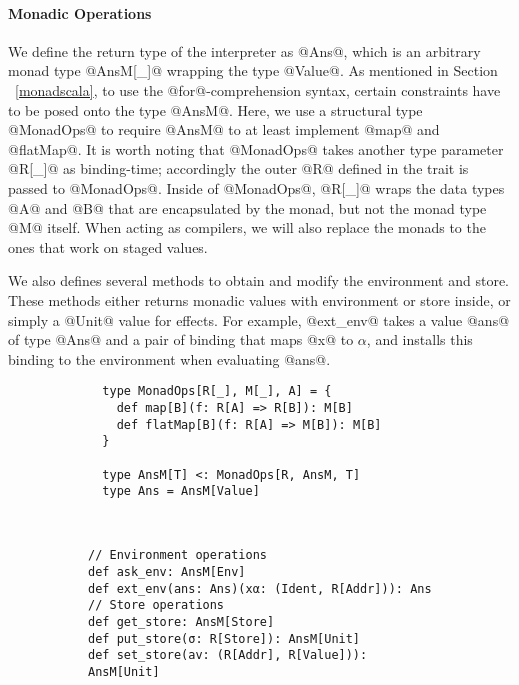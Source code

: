 \paragraph{Monadic Operations} We define the return type of the interpreter as
@Ans@, which is an arbitrary monad type @AnsM[_]@ wrapping the type @Value@. 
As mentioned in Section ~\ref{monadscala}, to use the @for@-comprehension
syntax, certain constraints have to be posed onto the type @AnsM@. Here, we use a
structural type @MonadOps@ to require @AnsM@ to at least implement @map@ and
@flatMap@. It is worth noting that @MonadOps@ takes another type parameter
@R[_]@ as binding-time; accordingly the outer @R@ defined in the trait is passed
to @MonadOps@. Inside of @MonadOps@, @R[_]@ wraps the data types @A@ and @B@ that are
encapsulated by the monad, but not the monad type @M@ itself. When acting as
compilers, we will also replace the monads to the ones that work on staged
values.

We also defines several methods to obtain and modify the environment and store.
These methods either returns monadic values with environment or store inside, or
simply a @Unit@ value for effects. For example, @ext_env@ takes a value @ans@ of
type @Ans@ and a pair of binding that maps @x@ to $\alpha$, and installs this
binding to the environment when evaluating @ans@.

\vspace{-1em}
\begin{figure}[h!]
  \centering
  \begin{subfigure}[b]{0.45\textwidth}
    \begin{lstlisting}
  type MonadOps[R[_], M[_], A] = {
    def map[B](f: R[A] => R[B]): M[B]
    def flatMap[B](f: R[A] => M[B]): M[B]
  }
  
  type AnsM[T] <: MonadOps[R, AnsM, T]
  type Ans = AnsM[Value]
    \end{lstlisting}
  \end{subfigure}
  ~
  \begin{subfigure}[b]{0.55\textwidth}
    \begin{lstlisting}
// Environment operations
def ask_env: AnsM[Env]
def ext_env(ans: Ans)(xα: (Ident, R[Addr])): Ans
// Store operations
def get_store: AnsM[Store]
def put_store(σ: R[Store]): AnsM[Unit]
def set_store(av: (R[Addr], R[Value])): AnsM[Unit]
    \end{lstlisting}
  \end{subfigure}
\end{figure}
\vspace{-1em}

